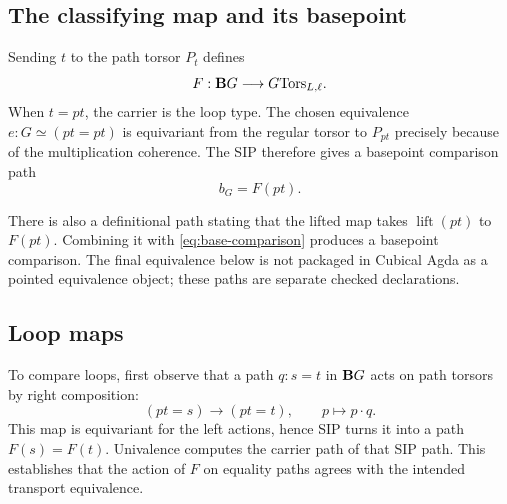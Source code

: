 
\subsection{The classifying map and its basepoint}
Sending $t$ to the path torsor $P_t$ defines
\begin{equation}
F:\mathbf{B}G\longrightarrow G\mathrm{Tors}_{L,\ell}.
\label{eq:path-classifying}
\end{equation}
When $t=pt$, the carrier is the loop type. The chosen equivalence $e:G\simeq(pt=pt)$ is equivariant from the regular torsor to $P_{pt}$ precisely because of the multiplication coherence. The SIP therefore gives a basepoint comparison path
\begin{equation}
b_G=F(pt).
\label{eq:base-comparison}
\end{equation}


\begin{remark}
There is also a definitional path stating that the lifted map takes $\operatorname{lift}(pt)$ to $F(pt)$. Combining it with \eqref{eq:base-comparison} produces a basepoint comparison. The final equivalence below is not packaged in Cubical Agda as a pointed equivalence object; these paths are separate checked declarations.
\end{remark}


\subsection{Loop maps}
To compare loops, first observe that a path $q:s=t$ in $\mathbf{B}G$ acts on path torsors by right composition:
\begin{equation}
(pt=s)\longrightarrow(pt=t), \qquad p\longmapsto p\mathbin{\cdot}q.
\end{equation}
This map is equivariant for the left actions, hence SIP turns it into a path $F(s)=F(t)$. Univalence computes the carrier path of that SIP path. This establishes that the action of $F$ on equality paths agrees with the intended transport equivalence.

